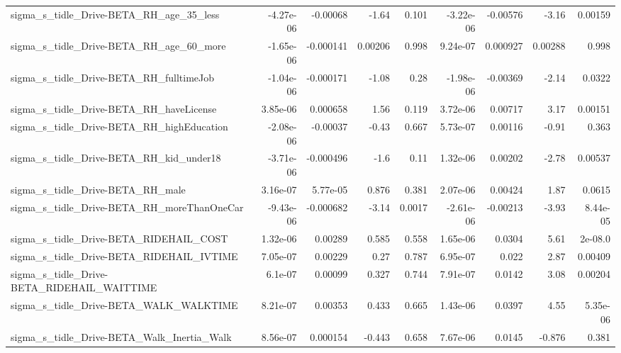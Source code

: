 \begin{tabular}{lrrrrrrrr}
sigma\_s\_tidle\_Drive-BETA\_RH\_age\_35\_less            &   -4.27e-06 &     -0.00068 &    -1.64 &    0.101 &  -3.22e-06 &    -0.00576 &        -3.16 &       0.00159 \\
sigma\_s\_tidle\_Drive-BETA\_RH\_age\_60\_more            &   -1.65e-06 &    -0.000141 &  0.00206 &    0.998 &   9.24e-07 &    0.000927 &      0.00288 &         0.998 \\
sigma\_s\_tidle\_Drive-BETA\_RH\_fulltimeJob            &   -1.04e-06 &    -0.000171 &    -1.08 &     0.28 &  -1.98e-06 &    -0.00369 &        -2.14 &        0.0322 \\
sigma\_s\_tidle\_Drive-BETA\_RH\_haveLicense            &    3.85e-06 &     0.000658 &     1.56 &    0.119 &   3.72e-06 &     0.00717 &         3.17 &       0.00151 \\
sigma\_s\_tidle\_Drive-BETA\_RH\_highEducation          &   -2.08e-06 &     -0.00037 &    -0.43 &    0.667 &   5.73e-07 &     0.00116 &        -0.91 &         0.363 \\
sigma\_s\_tidle\_Drive-BETA\_RH\_kid\_under18            &   -3.71e-06 &    -0.000496 &     -1.6 &     0.11 &   1.32e-06 &     0.00202 &        -2.78 &       0.00537 \\
sigma\_s\_tidle\_Drive-BETA\_RH\_male                   &    3.16e-07 &     5.77e-05 &    0.876 &    0.381 &   2.07e-06 &     0.00424 &         1.87 &        0.0615 \\
sigma\_s\_tidle\_Drive-BETA\_RH\_moreThanOneCar         &   -9.43e-06 &    -0.000682 &    -3.14 &   0.0017 &  -2.61e-06 &    -0.00213 &        -3.93 &      8.44e-05 \\
sigma\_s\_tidle\_Drive-BETA\_RIDEHAIL\_COST             &    1.32e-06 &      0.00289 &    0.585 &    0.558 &   1.65e-06 &      0.0304 &         5.61 &       2e-08.0 \\
sigma\_s\_tidle\_Drive-BETA\_RIDEHAIL\_IVTIME           &    7.05e-07 &      0.00229 &     0.27 &    0.787 &   6.95e-07 &       0.022 &         2.87 &       0.00409 \\
sigma\_s\_tidle\_Drive-BETA\_RIDEHAIL\_WAITTIME         &     6.1e-07 &      0.00099 &    0.327 &    0.744 &   7.91e-07 &      0.0142 &         3.08 &       0.00204 \\
sigma\_s\_tidle\_Drive-BETA\_WALK\_WALKTIME             &    8.21e-07 &      0.00353 &    0.433 &    0.665 &   1.43e-06 &      0.0397 &         4.55 &      5.35e-06 \\
sigma\_s\_tidle\_Drive-BETA\_Walk\_Inertia\_Walk         &    8.56e-07 &     0.000154 &   -0.443 &    0.658 &   7.67e-06 &      0.0145 &       -0.876 &         0.381 \\

\end{tabular}
